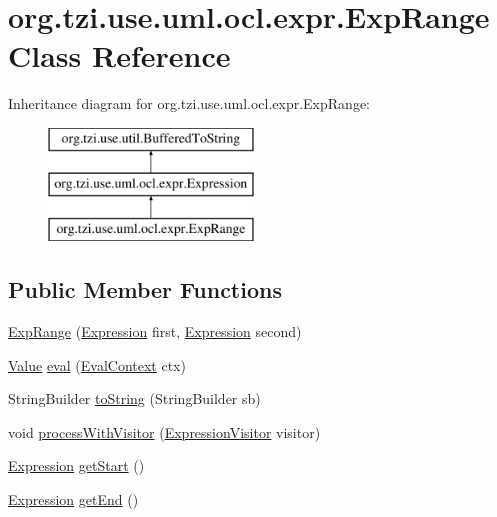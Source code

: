 \hypertarget{classorg_1_1tzi_1_1use_1_1uml_1_1ocl_1_1expr_1_1_exp_range}{\section{org.\-tzi.\-use.\-uml.\-ocl.\-expr.\-Exp\-Range Class Reference}
\label{classorg_1_1tzi_1_1use_1_1uml_1_1ocl_1_1expr_1_1_exp_range}
}
Inheritance diagram for org.\-tzi.\-use.\-uml.\-ocl.\-expr.\-Exp\-Range\-:\begin{figure}[H]
\begin{center}
\leavevmode
\includegraphics[height=3.000000cm]{classorg_1_1tzi_1_1use_1_1uml_1_1ocl_1_1expr_1_1_exp_range}
\end{center}
\end{figure}
\subsection*{Public Member Functions}
\begin{DoxyCompactItemize}
\item 
\hyperlink{classorg_1_1tzi_1_1use_1_1uml_1_1ocl_1_1expr_1_1_exp_range_aa6bd4124cb5d68eb5ec5a2e706a03246}{Exp\-Range} (\hyperlink{classorg_1_1tzi_1_1use_1_1uml_1_1ocl_1_1expr_1_1_expression}{Expression} first, \hyperlink{classorg_1_1tzi_1_1use_1_1uml_1_1ocl_1_1expr_1_1_expression}{Expression} second)
\item 
\hyperlink{classorg_1_1tzi_1_1use_1_1uml_1_1ocl_1_1value_1_1_value}{Value} \hyperlink{classorg_1_1tzi_1_1use_1_1uml_1_1ocl_1_1expr_1_1_exp_range_a2b9a4071c27b7eea74a73f85471c4c41}{eval} (\hyperlink{classorg_1_1tzi_1_1use_1_1uml_1_1ocl_1_1expr_1_1_eval_context}{Eval\-Context} ctx)
\item 
String\-Builder \hyperlink{classorg_1_1tzi_1_1use_1_1uml_1_1ocl_1_1expr_1_1_exp_range_a5e7115a0fcadbe03dcdf06049e10edec}{to\-String} (String\-Builder sb)
\item 
void \hyperlink{classorg_1_1tzi_1_1use_1_1uml_1_1ocl_1_1expr_1_1_exp_range_a17bcfeab5480ed17b877aa8a0ad816bb}{process\-With\-Visitor} (\hyperlink{interfaceorg_1_1tzi_1_1use_1_1uml_1_1ocl_1_1expr_1_1_expression_visitor}{Expression\-Visitor} visitor)
\item 
\hyperlink{classorg_1_1tzi_1_1use_1_1uml_1_1ocl_1_1expr_1_1_expression}{Expression} \hyperlink{classorg_1_1tzi_1_1use_1_1uml_1_1ocl_1_1expr_1_1_exp_range_a5630c985f155ee6f8d46e37052a322c6}{get\-Start} ()
\item 
\hyperlink{classorg_1_1tzi_1_1use_1_1uml_1_1ocl_1_1expr_1_1_expression}{Expression} \hyperlink{classorg_1_1tzi_1_1use_1_1uml_1_1ocl_1_1expr_1_1_exp_range_ae13b61e4fdca45e9aa27e0ed77580995}{get\-End} ()
\end{DoxyCompactItemize}

